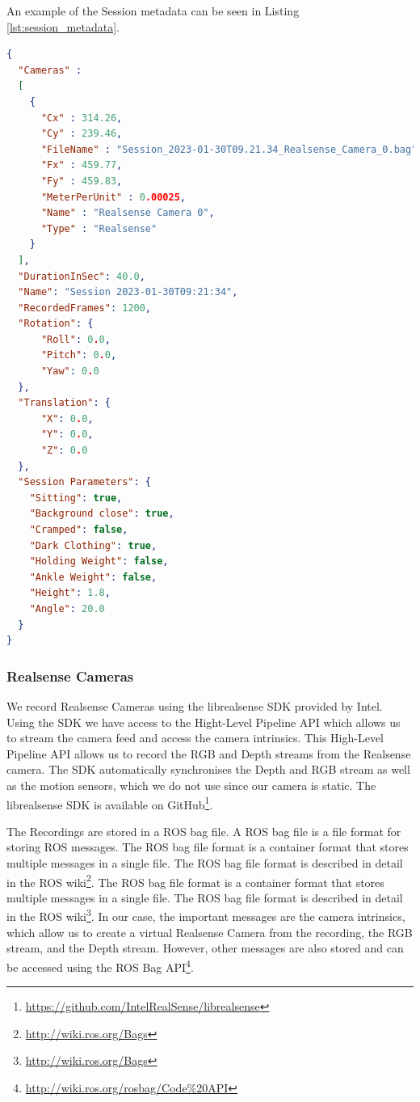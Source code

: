 An example of the Session metadata can be seen in Listing \ref{lst:session_metadata}.

\begin{lstlisting}[language=json,
                   firstnumber=1,
                   caption={[Example of session metadata]{Example of the Session metadata with a single Realsense Camera which was recorded for 40 seconds at around 30 frames per second resulting in 1200 frames. Some values have been changed to increase readability.}},
                   label={lst:session_metadata}]
{
  "Cameras" : 
  [
    {
      "Cx" : 314.26,
      "Cy" : 239.46,
      "FileName" : "Session_2023-01-30T09.21.34_Realsense_Camera_0.bag",
      "Fx" : 459.77,
      "Fy" : 459.83,
      "MeterPerUnit" : 0.00025,
      "Name" : "Realsense Camera 0",
      "Type" : "Realsense"
    }
  ],
  "DurationInSec": 40.0,
  "Name": "Session 2023-01-30T09:21:34",
  "RecordedFrames": 1200,
  "Rotation": {
      "Roll": 0.0,
      "Pitch": 0.0,
      "Yaw": 0.0
  },
  "Translation": {
      "X": 0.0,
      "Y": 0.0,
      "Z": 0.0
  },
  "Session Parameters": {
    "Sitting": true,
    "Background close": true,
    "Cramped": false,
    "Dark Clothing": true,
    "Holding Weight": false,
    "Ankle Weight": false,
    "Height": 1.8,
    "Angle": 20.0
  }
}
\end{lstlisting}

\subsubsection{Realsense Cameras}

We record Realsense Cameras using the librealsense SDK provided by Intel. Using the SDK we have access to the Hight-Level Pipeline API which allows us to stream the camera feed and access the camera intrinsics. This High-Level Pipeline API allows us to record the RGB and Depth streams from the Realsense camera. The SDK automatically synchronises the Depth and RGB stream as well as the motion sensors, which we do not use since our camera is static. The librealsense SDK is available on GitHub\footnote{\url{https://github.com/IntelRealSense/librealsense}}.

The Recordings are stored in a ROS bag file. A ROS bag file is a file format for storing ROS messages. The ROS bag file format is a container format that stores multiple messages in a single file. The ROS bag file format is described in detail in the ROS wiki\footnote{\url{http://wiki.ros.org/Bags}}. The ROS bag file format is a container format that stores multiple messages in a single file. The ROS bag file format is described in detail in the ROS wiki\footnote{\url{http://wiki.ros.org/Bags}}. In our case, the important messages are the camera intrinsics, which allow us to create a virtual Realsense Camera from the recording, the RGB stream, and the Depth stream. However, other messages are also stored and can be accessed using the ROS Bag API\footnote{\url{http://wiki.ros.org/rosbag/Code%20API}}.

